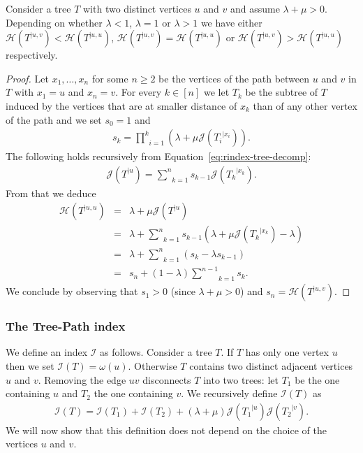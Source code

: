 \documentclass[11 pt]{modarticle}
\newcommand{\wmap}{\omega}
\newcommand{\rtree}[2]{{#1}^{\lvert #2}}
\newcommand{\indexsymbol}{\mathcal{I}}
\newcommand{\tindex}[1]{\indexsymbol(#1)}
\newcommand{\rindexsymbol}{\mathcal{J}}
\newcommand{\rindex}[2]{\rindexsymbol(\rtree{#2}{#1})}
\newcommand{\aindexsymbol}{\mathcal{H}}
\newcommand{\aindex}[3]{\aindexsymbol(\rtree{#3}{#1, #2})}
\begin{document}
\begin{lem}\label{lem:aindex-comp}
Consider a tree $T$ with two distinct vertices $u$ and $v$ and assume $\lambda + \mu > 0$. Depending on whether $\lambda < 1$, $\lambda = 1$ or $\lambda > 1$ we have either $\aindex{u}{v}{T} < \aindex{u}{u}{T}$, $\aindex{u}{v}{T} = \aindex{u}{u}{T}$ or $\aindex{u}{v}{T} > \aindex{u}{u}{T}$ respectively.
\end{lem}

\begin{proof}
Let $x_1, \dots, x_n$ for some $n \geq 2$ be the vertices of the path between $u$ and $v$ in $T$ with $x_1 = u$ and $x_n = v$. For every $k \in [n]$ we let $T_k$ be the subtree of $T$ induced by the vertices that are at smaller distance of $x_k$ than of any other vertex of the path and we set $s_0 = 1$ and
\begin{eqnarray*}
	s_k = \underset{i=1}{\overset{k}{\prod}} (\lambda + \mu \rindex{x_i}{T_i}).
\end{eqnarray*}
The following holds recursively from Equation~\eqref{eq:rindex-tree-decomp}:
\begin{eqnarray*}
	\rindex{u}{T} = \underset{k=1}{\overset{n}{\sum}} s_{k-1} \rindex{x_k}{T_k}.
\end{eqnarray*}
From that we deduce
\begin{eqnarray*}
	\aindex{u}{u}{T} & = & \lambda + \mu \rindex{u}{T} \\
	& = & \lambda + \underset{k=1}{\overset{n}{\sum}} s_{k-1}(\lambda + \mu \rindex{x_k}{T_k} - \lambda) \\
	& = & \lambda + \underset{k=1}{\overset{n}{\sum}} (s_k - \lambda s_{k-1}) \\
	& = & s_n + (1 - \lambda) \underset{k=1}{\overset{n-1}{\sum}} s_k.
\end{eqnarray*}
We conclude by observing that $s_1 > 0$ (since $\lambda + \mu > 0$) and $s_n = \aindex{u}{v}{T}$.
\end{proof}

\subsubsection{The Tree-Path index}

We define an index $\indexsymbol$ as follows. Consider a tree $T$. If $T$ has only one vertex $u$ then we set $\tindex{T} = \wmap(u)$. Otherwise $T$ contains two distinct adjacent vertices $u$ and $v$. Removing the edge $uv$ disconnects $T$ into two trees: let $T_1$ be the one containing $u$ and $T_2$ the one containing $v$. We recursively define $\tindex{T}$ as
\begin{eqnarray}
	\tindex{T} = \tindex{T_1} + \tindex{T_2} + (\lambda + \mu) \rindex{u}{T_1} \rindex{v}{T_2}. \label{eq:global-index-definition}
\end{eqnarray}
We will now show that this definition does not depend on the choice of the vertices $u$ and $v$.
\end{document}
